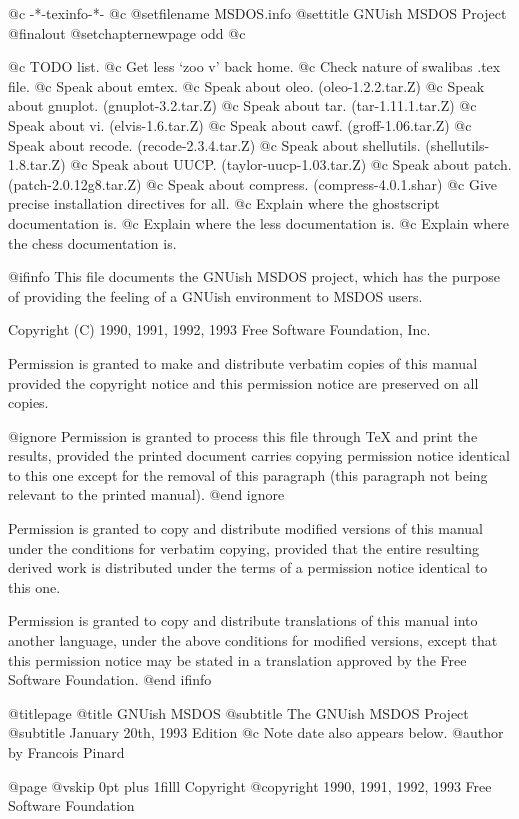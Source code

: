  @c -*-texinfo-*-
@c %
@setfilename MSDOS.info
@settitle GNUish MSDOS Project
@finalout
@setchapternewpage odd
@c %

@c TODO list.
@c Get less `zoo v' back home.
@c Check nature of swalibas .tex file.
@c Speak about emtex.
@c Speak about oleo.  (oleo-1.2.2.tar.Z)
@c Speak about gnuplot.  (gnuplot-3.2.tar.Z)
@c Speak about tar.  (tar-1.11.1.tar.Z)
@c Speak about vi.  (elvis-1.6.tar.Z)
@c Speak about cawf.  (groff-1.06.tar.Z)
@c Speak about recode.  (recode-2.3.4.tar.Z)
@c Speak about shellutils.  (shellutils-1.8.tar.Z)
@c Speak about UUCP.  (taylor-uucp-1.03.tar.Z)
@c Speak about patch.  (patch-2.0.12g8.tar.Z)
@c Speak about compress.  (compress-4.0.1.shar)
@c Give precise installation directives for all.
@c Explain where the ghostscript documentation is.
@c Explain where the less documentation is.
@c Explain where the chess documentation is.

@ifinfo
This file documents the GNUish MSDOS project, which has the purpose of
providing the feeling of a GNUish environment to MSDOS users.

Copyright (C) 1990, 1991, 1992, 1993 Free Software Foundation, Inc.

Permission is granted to make and distribute verbatim copies of
this manual provided the copyright notice and this permission notice
are preserved on all copies.

@ignore
Permission is granted to process this file through TeX and print the
results, provided the printed document carries copying permission
notice identical to this one except for the removal of this paragraph
(this paragraph not being relevant to the printed manual).
@end ignore

Permission is granted to copy and distribute modified versions of this
manual under the conditions for verbatim copying, provided that the entire
resulting derived work is distributed under the terms of a permission
notice identical to this one.

Permission is granted to copy and distribute translations of this manual
into another language, under the above conditions for modified versions,
except that this permission notice may be stated in a translation approved
by the Free Software Foundation.
@end ifinfo

@titlepage
@title GNUish MSDOS
@subtitle The GNUish MSDOS Project
@subtitle January 20th, 1993 Edition
@c Note date also appears below.
@author by Francois Pinard

@page
@vskip 0pt plus 1filll
Copyright @copyright{} 1990, 1991, 1992, 1993 Free Software Foundation

